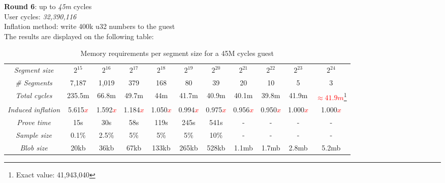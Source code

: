\documentclass[a4paper, 10pt]{article}
\begin{document}
\par \noindent
\textbf{Round 6}: up to \textit{45m} cycles\\
User cycles: \textit{32,390,116}\\
Inflation method: write 400k u32 numbers to the guest\\
The results are displayed on the following table:
\begin{table}[H]
  	\begin{center}
    \label{tab:table7}
    \begin{minipage}{\textwidth}
    \begin{adjustbox}{width=\textwidth}
    \begin{tabular}{c|c|c|c|c|c|c|c|c|c|c}
	  \textit{Segment size} & $2^{15}$ & $2^{16}$ & $2^{17}$ & $2^{18}$ & $2^{19}$ & $2^{20}$ & $2^{21}$ & $2^{22}$ & $2^{23}$ & $2^{24}$\\
	  \textit{\# Segments} & 7,187 & 1,019 & 379 & 168 & 80 & 39 & 20 & 10 & 5 & 3\\
	  \textit{Total cycles} & 235.5m & 66.8m & 49.7m & 44m & 41.7m & 40.9m & 40.1m & 39.8m & 41.9m & \textcolor{red}{$\approx 41.9m$}\footnote{Exact value: 41,943,040}\\
	  \textit{Induced inflation} & 5.615\textcolor{red}{$x$} & 1.592\textcolor{red}{$x$} & 1.184\textcolor{red}{$x$} & 1.050\textcolor{red}{$x$} & 0.994\textcolor{red}{$x$} & 0.975\textcolor{red}{$x$} & 0.956\textcolor{red}{$x$} & 0.950\textcolor{red}{$x$} & 1.000\textcolor{red}{$x$} & 1.000\textcolor{red}{$x$}\\
	  \textit{Prove time} & 15s & 30s & 58s & 119s & 245s & 541s & - & - & - & -\\
	  \textit{Sample size} & 0.1\% & 2.5\% & 5\% & 5\% & 5\% & 10\% & - & - & - & -\\
	  \textit{Blob size} & 20kb & 36kb & 67kb & 133kb & 265kb & 528kb & 1.1mb & 1.7mb & 2.8mb & 5.2mb\\
   	\end{tabular}
   	\end{adjustbox}
   	\end{minipage}
    \caption{Memory requirements per segment size for a 45M cycles guest}
  \end{center}
\end{table}
\end{document}
